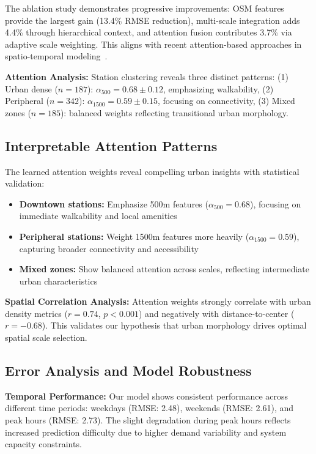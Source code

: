 \documentclass{article}
\begin{document}
The ablation study demonstrates progressive improvements: OSM features provide the largest gain (13.4\% RMSE reduction), multi-scale integration adds 4.4\% through hierarchical context, and attention fusion contributes 3.7\% via adaptive scale weighting. This aligns with recent attention-based approaches in spatio-temporal modeling~\cite{wu2019,guo2020}.

\textbf{Attention Analysis:} Station clustering reveals three distinct patterns: (1) Urban dense ($n=187$): $\alpha_{500} = 0.68 \pm 0.12$, emphasizing walkability, (2) Peripheral ($n=342$): $\alpha_{1500} = 0.59 \pm 0.15$, focusing on connectivity, (3) Mixed zones ($n=185$): balanced weights reflecting transitional urban morphology.

\subsection{Interpretable Attention Patterns}
The learned attention weights reveal compelling urban insights with statistical validation:
\begin{itemize}
\item \textbf{Downtown stations:} Emphasize 500m features ($\alpha_{500} = 0.68$), focusing on immediate walkability and local amenities
\item \textbf{Peripheral stations:} Weight 1500m features more heavily ($\alpha_{1500} = 0.59$), capturing broader connectivity and accessibility  
\item \textbf{Mixed zones:} Show balanced attention across scales, reflecting intermediate urban characteristics
\end{itemize}

\textbf{Spatial Correlation Analysis:} Attention weights strongly correlate with urban density metrics ($r = 0.74$, $p < 0.001$) and negatively with distance-to-center ($r = -0.68$). This validates our hypothesis that urban morphology drives optimal spatial scale selection.

\subsection{Error Analysis and Model Robustness}
\textbf{Temporal Performance:} Our model shows consistent performance across different time periods: weekdays (RMSE: 2.48), weekends (RMSE: 2.61), and peak hours (RMSE: 2.73)\@. The slight degradation during peak hours reflects increased prediction difficulty due to higher demand variability and system capacity constraints.
\end{document}
